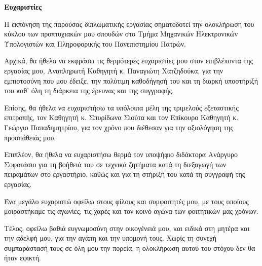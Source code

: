 \begin{center}
{\LARGE \textbf{Ευχαριστίες}}\\[1cm]
\end{center}

Η εκπόνηση της παρούσας διπλωματικής εργασίας σηματοδοτεί την ολοκλήρωση του κύκλου των προπτυχιακών μου σπουδών στο Τμήμα Μηχανικών Ηλεκτρονικών Υπολογιστών και Πληροφορικής του Πανεπιστημίου Πατρών.

Αρχικά, θα ήθελα να εκφράσω τις θερμότερες ευχαριστίες μου στον επιβλέποντα της εργασίας μου, Αναπληρωτή Καθηγητή κ. Παναγιώτη Χατζηδούκα, για την εμπιστοσύνη που μου έδειξε, την πολύτιμη καθοδήγησή του και τη διαρκή υποστήριξή του καθ' όλη τη διάρκεια της έρευνας και της συγγραφής.

Επίσης, θα ήθελα να ευχαριστήσω τα υπόλοιπα μέλη της τριμελούς εξεταστικής επιτροπής, τον Καθηγητή κ. Σπυρίδωνα Σιούτα και τον Επίκουρο Καθηγητή κ. Γεώργιο Παπαδημητρίου, για τον χρόνο που διέθεσαν για την αξιολόγηση της προσπάθειάς μου.

Επιπλέον, θα ήθελα να ευχαριστήσω θερμά τον υποψήφιο διδάκτορα Ανάργυρο Σοφοτάσιο για τη βοήθειά του σε τεχνικά ζητήματα κατά τη διεξαγωγή των πειραμάτων στο εργαστήριο, καθώς και για τη στήριξή του κατά τη συγγραφή της εργασίας.

Ένα μεγάλο ευχαριστώ οφείλω στους φίλους και συμφοιτητές μου, με τους οποίους μοιραστήκαμε τις αγωνίες, τις χαρές και τον κοινό αγώνα των φοιτητικών μας χρόνων.

Τέλος, οφείλω βαθιά ευγνωμοσύνη στην οικογένειά μου, και ειδικά στη μητέρα και την αδελφή μου, για την αγάπη και την υπομονή τους. Χωρίς τη συνεχή συμπαράστασή τους σε όλη μου την πορεία, η ολοκλήρωση αυτού του στόχου δεν θα ήταν εφικτή.